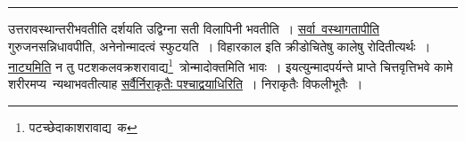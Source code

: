 \documentclass[11pt, openany]{book}
\begin{document}
\hrule

\vspace{2mm}

\begin{sloppypar}
\noindent
उत्तरावस्थान्तरीभवतीति दर्शयति उद्विग्ना सती विलापिनी भवतीति~। \underline{सर्वा\textendash\ वस्थागतापीति} गुरुजनसन्निधावपीति, अनेनोन्मादत्वं स्फुटयति~। विहारकाल इति क्रीडोचितेषु कालेषु रोदितीत्यर्थः~। \underline{नाट्यमिति} न तु पटशकलवक्रशरावाद्य\renewcommand{\thefootnote}{*}\footnote{पटच्छेदाकाशरावाद्य\textendash\ क}\textendash\ त्रोन्मादोक्तमिति भावः~। इयत्युन्मादपर्यन्ते प्राप्ते चित्तवृत्तिभवे कामे शरीरमप्य\textendash\ न्यथाभवतीत्याह \underline{सर्वैर्निराकृतैः पश्चाद्वयाधिरिति}~। निराकृतैः विफलीभूतैः~। 
\end{sloppypar}
\end{document}
